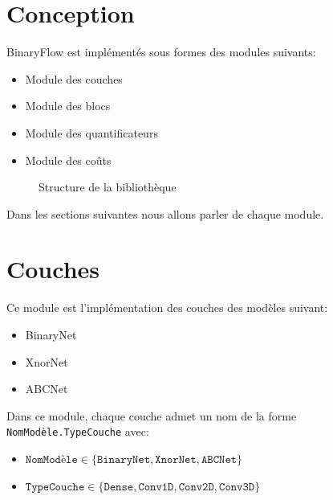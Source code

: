 \section{Conception}
BinaryFlow est implémentés sous formes des modules suivants:
\begin{itemize}
	\item Module des couches
	\item Module des blocs
	\item Module des quantificateurs
	\item Module des coûts
\end{itemize}

\begin{figure}[htp]
	\centering
	\caption{Structure de la bibliothèque}
\end{figure}


Dans les sections suivantes nous allons parler de chaque module.
\section{Couches}
Ce module est l'implémentation des couches des modèles suivant:
\begin{itemize}
	\item BinaryNet
	\item XnorNet
	\item ABCNet
\end{itemize}
Dans ce module, chaque couche admet un nom de la forme \texttt{NomModèle.TypeCouche} avec:
\begin{itemize}
	\item $\texttt{NomModèle} \in \{\texttt{BinaryNet},\texttt{XnorNet},\texttt{ABCNet}\}$
	\item $\texttt{TypeCouche} \in \{\texttt{Dense},\texttt{Conv1D},\texttt{Conv2D},\texttt{Conv3D}\}$
\end{itemize} 

